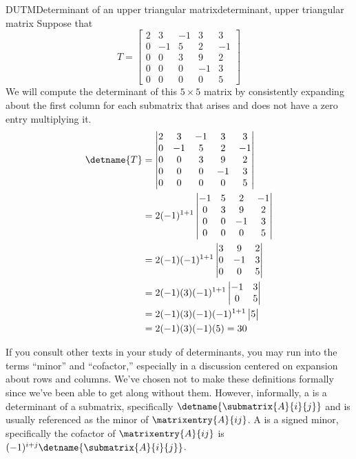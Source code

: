 \begin{example}{DUTM}{Determinant of an upper triangular matrix}{determinant, upper triangular matrix}
Suppose that
%
\begin{equation*}
T=
\begin{bmatrix}
2 & 3 & -1 & 3 & 3\\
0 & -1 & 5 & 2 & -1\\
0 & 0 & 3 & 9 & 2\\
0 & 0 & 0 & -1 & 3\\
0 & 0 & 0 & 0 & 5
\end{bmatrix}
\end{equation*}
%
We will compute the determinant of this $5\times 5$ matrix by consistently expanding about the first column for each submatrix that arises and does not have a zero entry multiplying it.
%
\begin{align*}
\detname{T}&=
\begin{vmatrix}
2 & 3 & -1 & 3 & 3\\
0 & -1 & 5 & 2 & -1\\
0 & 0 & 3 & 9 & 2\\
0 & 0 & 0 & -1 & 3\\
0 & 0 & 0 & 0 & 5
\end{vmatrix}\\
%
&=2(-1)^{1+1}
\begin{vmatrix}
-1 & 5 & 2 & -1\\
 0 & 3 & 9 & 2\\
 0 & 0 & -1 & 3\\
 0 & 0 & 0 & 5
\end{vmatrix}\\
%
&=2(-1)(-1)^{1+1}
\begin{vmatrix}
 3 & 9 & 2\\
 0 & -1 & 3\\
 0 & 0 & 5
\end{vmatrix}\\
%
&=2(-1)(3)(-1)^{1+1}
\begin{vmatrix}
 -1 & 3\\
 0 & 5
\end{vmatrix}\\
%
&=2(-1)(3)(-1)(-1)^{1+1}
\begin{vmatrix}
5
\end{vmatrix}\\
%
&=2(-1)(3)(-1)(5)=30
\end{align*}
%
\end{example}
%
If you consult other texts in your study of determinants, you may run into the terms ``minor'' and ``cofactor,'' especially in a discussion centered on expansion about rows and columns.  We've chosen not to make these definitions formally since we've been able to get along without them.  However, informally, a  is a determinant of a submatrix, specifically $\detname{\submatrix{A}{i}{j}}$ and is usually referenced as the minor of $\matrixentry{A}{ij}$.  A  is a signed minor, specifically the cofactor of $\matrixentry{A}{ij}$ is $(-1)^{i+j}\detname{\submatrix{A}{i}{j}}$.
%
%
